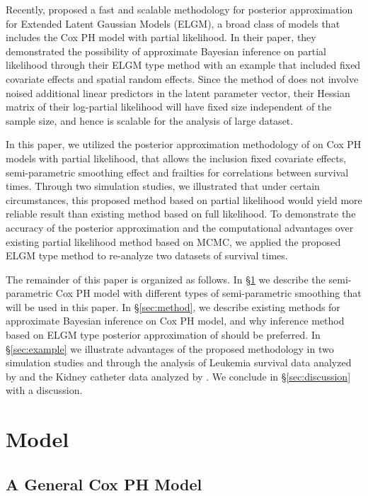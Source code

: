 \documentclass[ba]{imsart}
\begin{document}
Recently, \cite{ELGM} proposed a fast and scalable methodology for posterior approximation for Extended Latent Gaussian Models (ELGM), a broad class of models that includes the Cox PH model with partial likelihood. In their paper, they demonstrated the possibility of approximate Bayesian inference on partial likelihood through their ELGM type method with an example that included fixed covariate effects and spatial random effects. Since the method of \cite{ELGM} does not involve noised additional linear predictors in the latent parameter vector, their Hessian matrix of their log-partial likelihood will have fixed size independent of the sample size, and hence is scalable for the analysis of large dataset. 

In this paper, we utilized the posterior approximation methodology of \cite{ELGM} on Cox PH models with partial likelihood, that allows the inclusion fixed covariate effects, semi-parametric smoothing effect and frailties for correlations between survival times. Through two simulation studies, we illustrated that under certain circumstances, this proposed method based on partial likelihood would yield more reliable result than existing method based on full likelihood. To demonstrate the accuracy of the posterior approximation and the computational advantages over existing partial likelihood method based on MCMC, we applied the proposed ELGM type method to re-analyze two datasets of survival times.

The remainder of this paper is organized as follows. In \S\ref{sec:model} we describe the semi-parametric Cox PH model with different types of semi-parametric smoothing that will be used in this paper. In \S\ref{sec:method}, we describe existing methods for approximate Bayesian inference on Cox PH model, and why inference method based on ELGM type posterior approximation of \cite{ELGM} should be preferred. In \S\ref{sec:example} we illustrate advantages of the proposed methodology in two simulation studies and through the analysis of Leukemia survival data analyzed by \cite{inlacoxph} and the Kidney catheter data analyzed by \cite{kidney}. We conclude in \S\ref{sec:discussion} with a discussion.

\section{Model}\label{sec:model}

\subsection{A General Cox PH Model}
\end{document}
